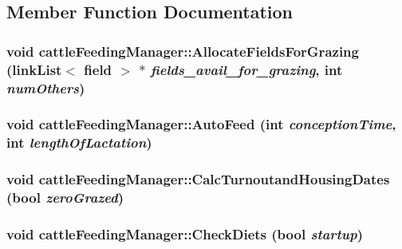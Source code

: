 \subsection{Member Function Documentation}
\hypertarget{classcattle_feeding_manager_ae70db6fbe1e89dbfd363f475f1536bb0}{
\subsubsection[{AllocateFieldsForGrazing}]{\setlength{\rightskip}{0pt plus 5cm}void cattleFeedingManager::AllocateFieldsForGrazing ({\bf linkList}$<$ {\bf field} $>$ $\ast$ {\em fields\_\-avail\_\-for\_\-grazing}, \/  int {\em numOthers})}}
\label{classcattle_feeding_manager_ae70db6fbe1e89dbfd363f475f1536bb0}
\hypertarget{classcattle_feeding_manager_afe78e7b55dc96e2301072429293e97b7}{
\subsubsection[{AutoFeed}]{\setlength{\rightskip}{0pt plus 5cm}void cattleFeedingManager::AutoFeed (int {\em conceptionTime}, \/  int {\em lengthOfLactation})}}
\label{classcattle_feeding_manager_afe78e7b55dc96e2301072429293e97b7}
\hypertarget{classcattle_feeding_manager_afb017b43e76fa6be2dcf1ee3419bf870}{
\subsubsection[{CalcTurnoutandHousingDates}]{\setlength{\rightskip}{0pt plus 5cm}void cattleFeedingManager::CalcTurnoutandHousingDates (bool {\em zeroGrazed})}}
\label{classcattle_feeding_manager_afb017b43e76fa6be2dcf1ee3419bf870}
\hypertarget{classcattle_feeding_manager_a5d75b196c96519719f5580eadea8209e}{
\subsubsection[{CheckDiets}]{\setlength{\rightskip}{0pt plus 5cm}void cattleFeedingManager::CheckDiets (bool {\em startup})}}
